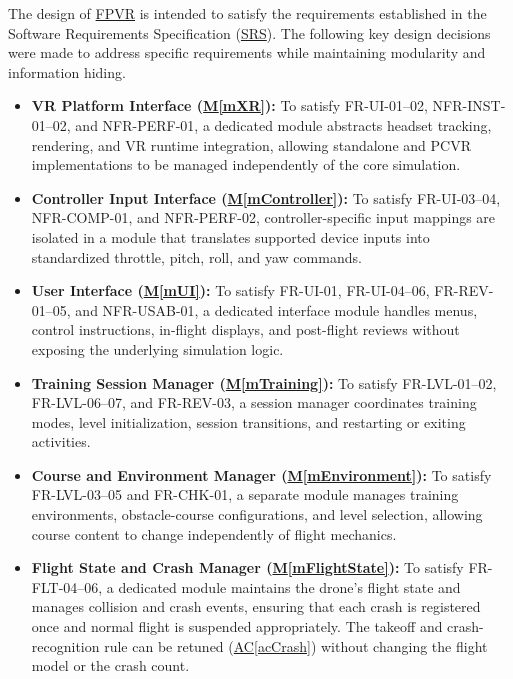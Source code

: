 \documentclass[12pt, titlepage]{article}
\DeclareRobustCommand{\mgabbr}[2]{\hyperlink{mg-abbr:#1}{#2}}
\newcommand{\acref}[1]{\mgabbr{ac}{AC}\ref{#1}}
\newcommand{\mref}[1]{\hyperref[#1]{M\ref*{#1}}}
\begin{document}
The design of \mgabbr{fpvr}{FPVR} is intended to satisfy the requirements
established in the Software Requirements Specification (\mgabbr{srs}{SRS}).
The following key design decisions were made to address
specific requirements while maintaining modularity and
information hiding.

\begin{itemize}

    \item \textbf{VR Platform Interface (\mref{mXR}):}
    To satisfy FR-UI-01--02, NFR-INST-01--02, and
    NFR-PERF-01, a dedicated module abstracts headset tracking,
    rendering, and VR runtime integration, allowing standalone
    and PCVR implementations to be managed independently of
    the core simulation.

    \item \textbf{Controller Input Interface (\mref{mController}):}
    To satisfy FR-UI-03--04, NFR-COMP-01, and NFR-PERF-02,
    controller-specific input mappings are isolated in a module
    that translates supported device inputs into standardized
    throttle, pitch, roll, and yaw commands.

    \item \textbf{User Interface (\mref{mUI}):}
    To satisfy FR-UI-01, FR-UI-04--06, FR-REV-01--05,
    and NFR-USAB-01, a dedicated interface module handles
    menus, control instructions, in-flight displays, and
    post-flight reviews without exposing the underlying
    simulation logic.

    \item \textbf{Training Session Manager (\mref{mTraining}):}
    To satisfy FR-LVL-01--02, FR-LVL-06--07, and FR-REV-03,
    a session manager coordinates training modes, level
    initialization, session transitions, and restarting or
    exiting activities.

    \item \textbf{Course and Environment Manager (\mref{mEnvironment}):}
    To satisfy FR-LVL-03--05 and FR-CHK-01, a separate module
    manages training environments, obstacle-course
    configurations, and level selection, allowing course
    content to change independently of flight mechanics.

    \item \textbf{Flight State and Crash Manager (\mref{mFlightState}):}
    To satisfy FR-FLT-04--06, a dedicated module maintains
    the drone's flight state and manages collision and crash
    events, ensuring that each crash is registered once and
    normal flight is suspended appropriately. The takeoff and
    crash-recognition rule can be retuned (\acref{acCrash}) without
    changing the flight model or the crash count.


\end{itemize}
\end{document}
